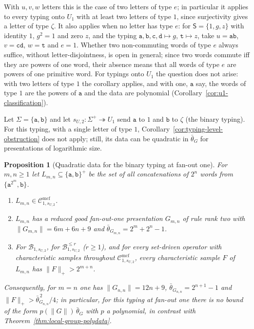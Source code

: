 \documentclass[11pt]{article}
\numberwithin{equation}{section}
\theoremstyle{plain}
\newtheorem{proposition}[theorem]{Proposition}
\theoremstyle{definition}
\theoremstyle{remark}
\newcommand{\Cmcf}[2]{\mathcal{C}^{\mathrm{mcf}}_{#1,#2}}
\theoremstyle{plain}
\begin{document}
With $u,v,w$ letters this is the case of two letters of type $e$; in
particular it applies to every typing onto $U_1$ with at least two letters of
type $1$, since surjectivity gives a letter of type $\zeta$.  It also applies
when no letter has type $e$: for $\mathsf S=\{1,g,z\}$ with identity $1$,
$g^2=1$ and zero $z$, and the typing $\mathtt a,\mathtt b,\mathtt c,\mathtt d\mapsto g$,
$\mathtt t\mapsto z$, take $u=\mathtt{ab}$, $v=\mathtt{cd}$, $w=\mathtt t$ and
$e=1$.  Whether two non-commuting words of type $e$ always suffice, without
letter-disjointness, is open in general; since two words commute iff they are
powers of one word, their absence means that all words of type $e$ are powers of
one primitive word.  For typings onto $U_1$ the question does not arise: with
two letters of type $1$ the corollary applies, and with one, $\mathtt a$ say, the
words of type $1$ are the powers of $\mathtt a$ and the data are polynomial
(Corollary~\ref{cor:u1-classification}).

Let $\Sigma=\{\mathtt a,\mathtt b\}$ and let $s_{U,2}:\Sigma^+\twoheadrightarrow U_1$ send $\mathtt a$ to
$1$ and $\mathtt b$ to $\zeta$ (the binary typing).  For this typing, with a single letter of type $1$,
Corollary~\ref{cor:typing-level-obstruction} does not apply; still, its data can
be quadratic in $\bar\theta_G$ for presentations of logarithmic size.

\begin{proposition}[Quadratic data for the binary typing at fan-out one]
\label{prop:binary-u1-quadratic}
For $m,n\ge1$ let $L_{m,n}\subseteq\{\mathtt a,\mathtt b\}^+$ be the set of all
concatenations of $2^n$ words from $\{\mathtt a^{2^m},\mathtt b\}$.
\begin{enumerate}[label=\textup{(\roman*)},leftmargin=*]
\item $L_{m,n}\in\Cmcf{1}{s_{U,2}}$.
\item $L_{m,n}$ has a reduced good fan-out-one presentation $G_{m,n}$ of rule rank
two with $\|G_{m,n}\|=6m+6n+9$ and $\bar\theta_{G_{m,n}}=2^m+2^n-1$.
\item For $\mathcal B_{1,s_{U,2}}$, for $\mathcal B^{\le r}_{1,s_{U,2}}$ \textup($r\ge1$\textup),
and for every set-driven operator with characteristic samples throughout
$\Cmcf{1}{s_{U,2}}$, every characteristic sample $F$ of $L_{m,n}$ has
$\|F\|_+>2^{m+n}$.
\end{enumerate}
Consequently, for $m=n$ one has $\|G_{n,n}\|=12n+9$, $\bar\theta_{G_{n,n}}=2^{n+1}-1$
and $\|F\|_+>\bar\theta_{G_{n,n}}^{\,2}/4$; in particular, for this typing at
fan-out one there is no bound of the form $p(\|G\|)\,\bar\theta_G$ with $p$ a
polynomial, in contrast with Theorem~\ref{thm:local-group-polydata}.
\end{proposition}
\end{document}
